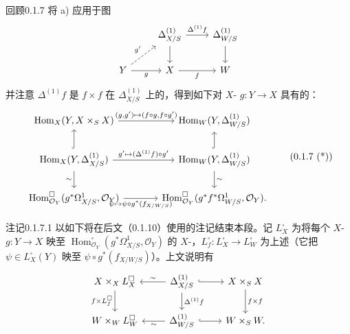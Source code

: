 \begin{SGAresult}{回顾}{0.1.7}
将 a) 应用于图
\[\begin{tikzcd}&\Delta^{(1)}_{X/S}\arrow[r,"\Delta^{(1)}f"]\arrow[d]&\Delta^{(1)}_{W/S}\arrow[d]\\Y\arrow[ur,dashed,"g'"]\arrow[r,"g"']&X\arrow[r,"f"']&W\end{tikzcd}\]
并注意 $\Delta^{(1)}f$ 是 $f\times f$ 在 $\Delta^{(1)}_{X/S}$ 上的，得到如下对 $X$- $g:Y\to X$ 具有的：
\[\begin{tikzcd}[column sep=large]
\operatorname{Hom}_X(Y,X\times_S X)\arrow[r,"{(g,g')\mapsto(f\circ g,f\circ g')}"]&\operatorname{Hom}_W(Y,\Delta^{(1)}_{W/S})\\
\operatorname{Hom}_X(Y,\Delta^{(1)}_{X/S})\arrow[u,hook]\arrow[r,"g'\mapsto(\Delta^{(1)}f)\circ g'"]\arrow[d,"\sim"']&\operatorname{Hom}_W(Y,\Delta^{(1)}_{W/S})\arrow[u,hook]\arrow[d,"\sim"]\\
\operatorname{Hom}^{\square}_{\mathcal O_Y}(g^*\Omega^1_{X/S},\mathcal O_Y)\arrow[r,"\psi\mapsto\psi\circ g^*(f_{X/W/S})"']&\operatorname{Hom}^{\square}_{\mathcal O_Y}(g^*f^*\Omega^1_{W/S},\mathcal O_Y).
\end{tikzcd}\tag{0.1.7 (*)}\]
\end{SGAresult}
\begin{SGAresult}{注记}{0.1.7.1}
以如下将在后文（0.1.10）使用的注记结束本段。记 $L_X^{\square}$ 为将每个 $X$- $g:Y\to X$ 映至 $\operatorname{Hom}^{\square}_{\mathcal O_Y}(g^*\Omega^1_{X/S},\mathcal O_Y)$ 的 $X$-，$L_f^{\square}:L_X^{\square}\to L_W^{\square}$ 为上述（它把 $\psi\in L_X^{\square}(Y)$ 映至 $\psi\circ g^*(f_{X/W/S})$）。上文说明有
\[\begin{tikzcd}
X\times_X L_X^{\square}\arrow[d,"f\times L_f^{\square}"']&\Delta^{(1)}_{X/S}\arrow[l,"\sim"']\arrow[r,hook]\arrow[d,"\Delta^{(1)}f"]&X\times_S X\arrow[d,"f\times f"]\\
W\times_W L_W^{\square}&\Delta^{(1)}_{W/S}\arrow[l,"\sim"]\arrow[r,hook]&W\times_S W.
\end{tikzcd}\]
\end{SGAresult}

